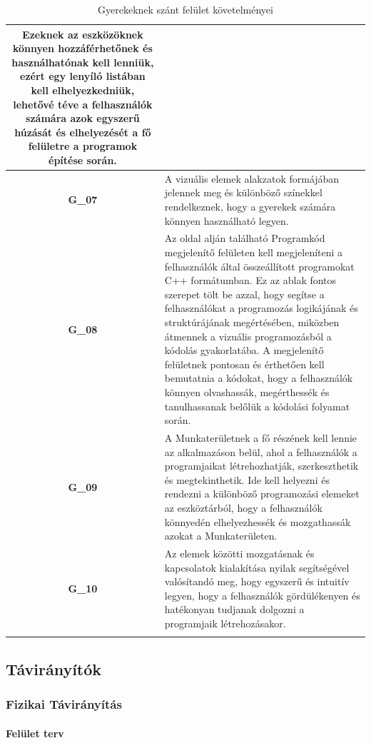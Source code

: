 \documentclass{article}
\begin{document}
\begin{longtable}{|c|p{14cm}|}
Ezeknek az eszközöknek könnyen hozzáférhetőnek és használhatónak kell lenniük, ezért egy lenyíló listában kell elhelyezkedniük, lehetővé téve a felhasználók számára azok egyszerű húzását és elhelyezését a fő felületre a programok építése során.\\\hline

\textbf{G\_07} & A vizuális elemek alakzatok formájában jelennek meg és különböző színekkel rendelkeznek, hogy a gyerekek számára könnyen használható legyen. \\\hline
\textbf{G\_08} & Az oldal alján található Programkód megjelenítő felületen kell megjeleníteni a felhasználók által összeállított programokat C++ formátumban. Ez az ablak fontos szerepet tölt be azzal, hogy segítse a felhasználókat a programozás logikájának és struktúrájának megértésében, miközben átmennek a vizuális programozásból a kódolás gyakorlatába. A megjelenítő felületnek pontosan és érthetően kell bemutatnia a kódokat, hogy a felhasználók könnyen olvashassák, megérthessék és tanulhassanak belőlük a kódolási folyamat során.\\\hline

\textbf{G\_09} & A Munkaterületnek a fő részének kell lennie az alkalmazáson belül, ahol a felhasználók a programjaikat létrehozhatják, szerkeszthetik és megtekinthetik. Ide kell helyezni és rendezni a különböző programozási elemeket az eszköztárból, hogy a felhasználók könnyedén elhelyezhessék és mozgathassák azokat a Munkaterületen.\\\hline

\textbf{G\_10} & Az elemek közötti mozgatásnak és kapcsolatok kialakítása nyilak segítségével valósítandó meg, hogy egyszerű és intuitív legyen, hogy a felhasználók gördülékenyen és hatékonyan tudjanak dolgozni a programjaik létrehozásakor. \\\hline
\hline
\caption{Gyerekeknek szánt felület követelményei}
\end{longtable}
\endgroup

\subsection{Távirányítók}
\subsubsection{Fizikai Távirányítás}
\paragraph{Felület terv}
\end{document}
